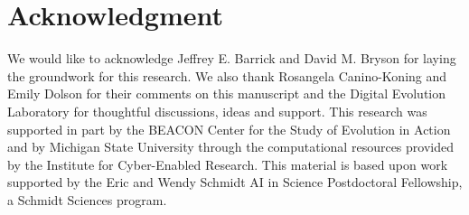 \section*{Acknowledgment}

We would like to acknowledge Jeffrey E. Barrick and David M. Bryson for laying the groundwork for this research.
We also thank Rosangela Canino-Koning and Emily Dolson for their comments on this manuscript and the Digital Evolution Laboratory for thoughtful discussions, ideas and support.
This research was supported in part by the BEACON Center for the Study of Evolution in Action and by Michigan State University through the computational resources provided by the Institute for Cyber-Enabled Research.
This material is based upon work supported by the Eric and Wendy Schmidt AI in Science Postdoctoral Fellowship, a Schmidt Sciences program.
